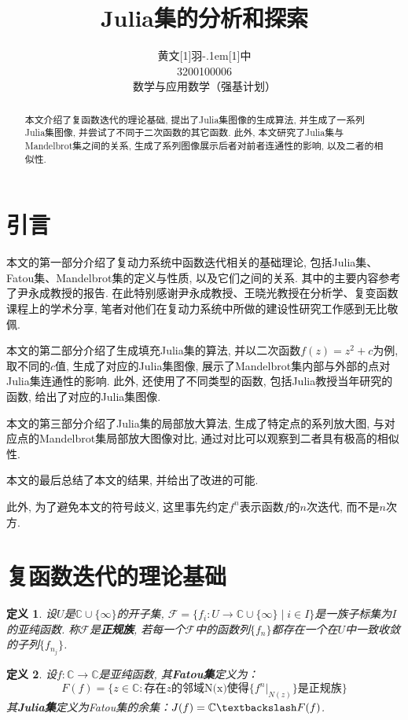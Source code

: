 \documentclass[UTF8]{ctexart}
\title{\textbf{Julia集的分析和探索}}
\date{}
\author{\CJKfamily{kai} 黄文\hbox{\scalebox{0.6}[1]{羽}\kern-.1em\scalebox{0.5}[1]{中}}\\3200100006\\数学与应用数学（强基计划）}
\newtheorem{definition}{定义}
\begin{document}
\maketitle

\begin{abstract}
     本文介绍了复函数迭代的理论基础, 提出了Julia集图像的生成算法, 并生成了一系列Julia集图像, 并尝试了不同于二次函数的其它函数. 此外, 本文研究了Julia集与Mandelbrot集之间的关系, 生成了系列图像展示后者对前者连通性的影响, 以及二者的相似性.
\end{abstract}

\section{引言}

本文的第一部分介绍了复动力系统中函数迭代相关的基础理论, 包括Julia集、Fatou集、Mandelbrot集的定义与性质, 以及它们之间的关系. 其中的主要内容参考了尹永成教授的报告. 在此特别感谢尹永成教授、王晓光教授在分析学、复变函数课程上的学术分享, 笔者对他们在复动力系统中所做的建设性研究工作感到无比敬佩. 

本文的第二部分介绍了生成填充Julia集的算法, 并以二次函数$f(z)=z^2+c$为例, 取不同的$c$值, 生成了对应的Julia集图像, 展示了Mandelbrot集内部与外部的点对Julia集连通性的影响. 此外, 还使用了不同类型的函数, 包括Julia教授当年研究的函数, 给出了对应的Julia集图像. 

本文的第三部分介绍了Julia集的局部放大算法, 生成了特定点的系列放大图, 与对应点的Mandelbrot集局部放大图像对比, 通过对比可以观察到二者具有极高的相似性. 

本文的最后总结了本文的结果, 并给出了改进的可能. 

此外, 为了避免本文的符号歧义, 这里事先约定$f^n$表示函数$f$的$n$次迭代, 而不是$n$次方. 

\section{复函数迭代的理论基础}

\begin{definition}
    设$U$是$\mathbb{C}\cup\{\infty\}$的开子集, $\mathcal{F}=\{f_i:U\to \mathbb{C}\cup\{\infty\}\;|\; i\in I\}$是一族子标集为$I$的亚纯函数. 称$\mathcal{F}$是\textbf{正规族}, 若每一个$\mathcal{F}$中的函数列$\{f_n\}$都存在一个在$U$中一致收敛的子列$\{f_{n_j}\}$. \cite{2014Fractals}
\end{definition}

\begin{definition}
    设$f:\mathbb{C}\to\mathbb{C}$是亚纯函数, 其\textbf{Fatou集}定义为：
    \begin{equation*}
        F(f)=\{z\in\mathbb{C}:\text{存在}z\text{的邻域N(x)使得}\{f^n|_{N(z)}\}\text{是正规族}\}
    \end{equation*}
    其\textbf{Julia集}定义为Fatou集的余集：$J(f)=\mathbb{C}\textbackslash F(f)$. \cite{2014Fractals}
\end{definition}
\end{document}
